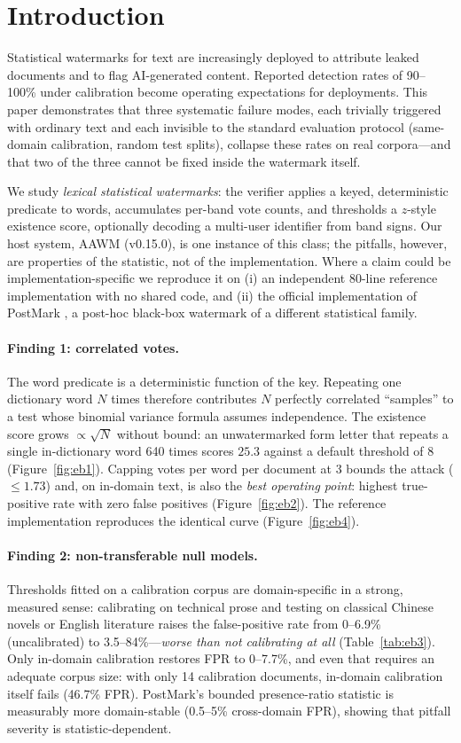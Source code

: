 \section{Introduction}
Statistical watermarks for text are increasingly deployed to attribute
leaked documents and to flag AI-generated content. Reported detection rates
of 90--100\% under calibration become operating expectations for
deployments. This paper demonstrates that three systematic failure modes,
each trivially triggered with ordinary text and each invisible to the
standard evaluation protocol (same-domain calibration, random test splits),
collapse these rates on real corpora---and that two of the three cannot be
fixed inside the watermark itself.

We study \emph{lexical statistical watermarks}: the verifier applies a
keyed, deterministic predicate to words, accumulates per-band vote counts,
and thresholds a $z$-style existence score, optionally decoding a multi-user
identifier from band signs. Our host system, AAWM (v0.15.0), is one instance
of this class; the pitfalls, however, are properties of the statistic, not
of the implementation. Where a claim could be implementation-specific we
reproduce it on (i) an independent 80-line reference implementation with no
shared code, and (ii) the official implementation of PostMark
\cite{postmark}, a post-hoc black-box watermark of a different statistical
family.

\paragraph{Finding 1: correlated votes.}
The word predicate is a deterministic function of the key. Repeating one
dictionary word $N$ times therefore contributes $N$ perfectly correlated
``samples'' to a test whose binomial variance formula assumes independence.
The existence score grows $\propto\sqrt{N}$ without bound: an unwatermarked
form letter that repeats a single in-dictionary word 640 times scores
$25.3$ against a default threshold of $8$ (Figure~\ref{fig:eb1}). Capping
votes per word per document at 3 bounds the attack ($\le 1.73$) and, on
in-domain text, is also the \emph{best operating point}: highest true-positive
rate with zero false positives (Figure~\ref{fig:eb2}). The reference
implementation reproduces the identical curve (Figure~\ref{fig:eb4}).

\paragraph{Finding 2: non-transferable null models.}
Thresholds fitted on a calibration corpus are domain-specific in a strong,
measured sense: calibrating on technical prose and testing on classical
Chinese novels or English literature raises the false-positive rate from
0--6.9\% (uncalibrated) to 3.5--84\%---\emph{worse than not calibrating at
all} (Table~\ref{tab:eb3}). Only in-domain calibration restores FPR to
0--7.7\%, and even that requires an adequate corpus size: with only 14
calibration documents, in-domain calibration itself fails (46.7\% FPR).
PostMark's bounded presence-ratio statistic is measurably more
domain-stable (0.5--5\% cross-domain FPR), showing that pitfall severity is
statistic-dependent.

